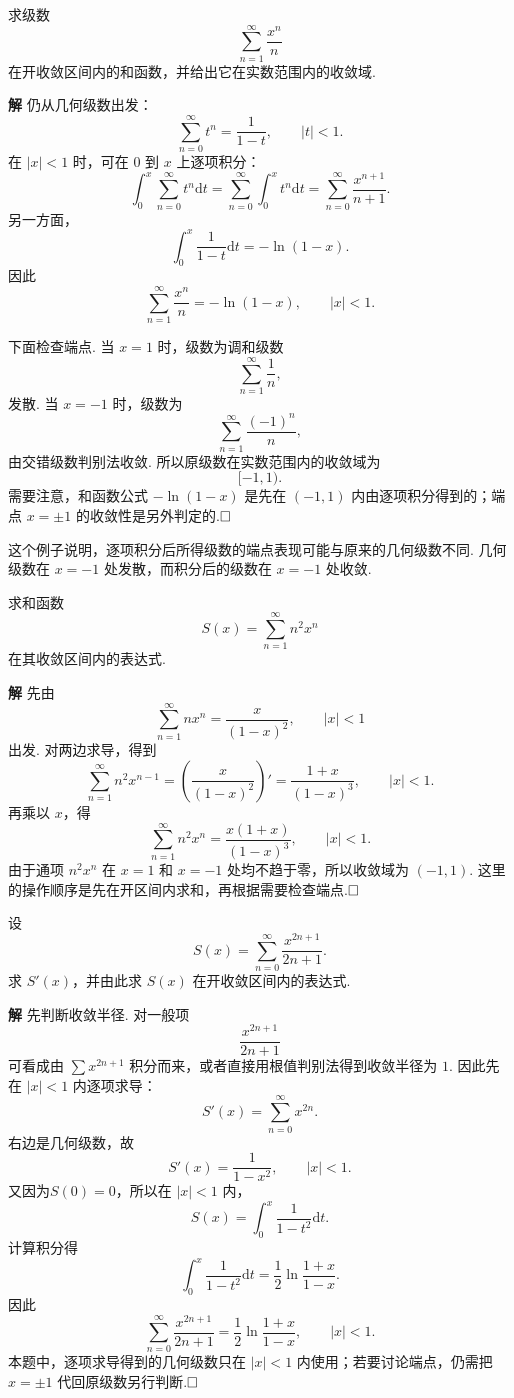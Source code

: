 \documentclass{ctexart}
\newcommand{\dd}{\mathrm{d}}
\newenvironment{custom}[1]{\par\noindent \textbf{#1}\quad}{\par\vspace{1em}}
\begin{document}
\begin{example}
求级数
\[
\sum_{n=1}^{\infty}\frac{x^n}{n}
\]
在开收敛区间内的和函数，并给出它在实数范围内的收敛域.
\end{example}

\begin{custom}{解}
仍从几何级数出发：
\[
\sum_{n=0}^{\infty}t^n=\frac{1}{1-t},\qquad |t|<1.
\]
在 $|x|<1$ 时，可在 $0$ 到 $x$ 上逐项积分：
\[
\int_0^x\sum_{n=0}^{\infty}t^n\dd t
=
\sum_{n=0}^{\infty}\int_0^x t^n\dd t
=
\sum_{n=0}^{\infty}\frac{x^{n+1}}{n+1}.
\]
另一方面，
\[
\int_0^x\frac{1}{1-t}\dd t=-\ln(1-x).
\]
因此
\[
\sum_{n=1}^{\infty}\frac{x^n}{n}=-\ln(1-x),
\qquad |x|<1.
\]

下面检查端点. 当 $x=1$ 时，级数为调和级数
\[
\sum_{n=1}^{\infty}\frac{1}{n},
\]
发散. 当 $x=-1$ 时，级数为
\[
\sum_{n=1}^{\infty}\frac{(-1)^n}{n},
\]
由交错级数判别法收敛. 所以原级数在实数范围内的收敛域为
\[
[-1,1).
\]
需要注意，和函数公式 $-\ln(1-x)$ 是先在 $(-1,1)$ 内由逐项积分得到的；端点 $x=\pm 1$ 的收敛性是另外判定的.$\hfill{\square}$
\end{custom}

这个例子说明，逐项积分后所得级数的端点表现可能与原来的几何级数不同. 几何级数在 $x=-1$ 处发散，而积分后的级数在 $x=-1$ 处收敛.

\begin{example}
求和函数
\[
S(x)=\sum_{n=1}^{\infty}n^2x^n
\]
在其收敛区间内的表达式.
\end{example}

\begin{custom}{解}
先由
\[
\sum_{n=1}^{\infty}nx^n=\frac{x}{(1-x)^2},\qquad |x|<1
\]
出发. 对两边求导，得到
\[
\sum_{n=1}^{\infty}n^2x^{n-1}
=\left(\frac{x}{(1-x)^2}\right)'
=\frac{1+x}{(1-x)^3},
\qquad |x|<1.
\]
再乘以 $x$，得
\[
\sum_{n=1}^{\infty}n^2x^n
=\frac{x(1+x)}{(1-x)^3},
\qquad |x|<1.
\]
由于通项 $n^2x^n$ 在 $x=1$ 和 $x=-1$ 处均不趋于零，所以收敛域为 $(-1,1)$. 这里的操作顺序是先在开区间内求和，再根据需要检查端点.$\hfill{\square}$
\end{custom}

\begin{example}
设
\[
S(x)=\sum_{n=0}^{\infty}\frac{x^{2n+1}}{2n+1}.
\]
求 $S'(x)$，并由此求 $S(x)$ 在开收敛区间内的表达式.
\end{example}

\begin{custom}{解}
先判断收敛半径. 对一般项
\[
\frac{x^{2n+1}}{2n+1}
\]
可看成由 $\sum x^{2n+1}$ 积分而来，或者直接用根值判别法得到收敛半径为 $1$. 因此先在 $|x|<1$ 内逐项求导：
\[
S'(x)=\sum_{n=0}^{\infty}x^{2n}.
\]
右边是几何级数，故
\[
S'(x)=\frac{1}{1-x^2},\qquad |x|<1.
\]
又因为$S(0)=0$，所以在 $|x|<1$ 内，
\[
S(x)=\int_0^x\frac{1}{1-t^2}\dd t.
\]
计算积分得
\[
\int_0^x\frac{1}{1-t^2}\dd t
=\frac12\ln\frac{1+x}{1-x}.
\]
因此
\[
\sum_{n=0}^{\infty}\frac{x^{2n+1}}{2n+1}
=\frac12\ln\frac{1+x}{1-x},
\qquad |x|<1.
\]
本题中，逐项求导得到的几何级数只在 $|x|<1$ 内使用；若要讨论端点，仍需把 $x=\pm1$ 代回原级数另行判断.$\hfill{\square}$
\end{custom}
\end{document}
